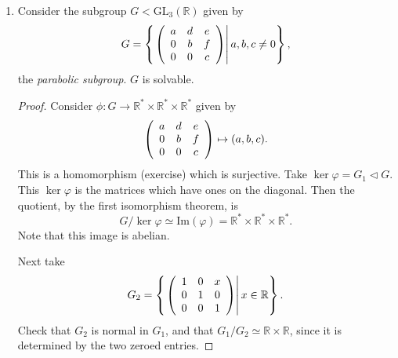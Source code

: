 \begin{xmpl}
\begin{enumerate}
  \item{Consider the subgroup $G < \mathrm{GL}_3(\mathbb{R})$ given by
      $$
      G = \left\{\left.
          \left(\begin{array}{c c c}
            a & d & e \\ 0 & b & f \\ 0 & 0 & c
          \end{array}\right)\right|a, b, c \neq 0\right\},
      $$
      the \emph{parabolic subgroup}. $G$ is solvable.

      \begin{proof}
        Consider $\phi : G
                     \to \mathbb{R}^* \times \mathbb{R}^* \times \mathbb{R}^*$
        given by
        $$
        \left(\begin{array}{c c c}
          a & d & e \\ 0 & b & f \\ 0 & 0 & c
        \end{array}\right) \mapsto (a,b,c).
        $$
        This is a homomorphism (exercise) which is
        surjective. Take $\ker \varphi = G_1 \triangleleft G$.
        This $\ker \varphi$ is the matrices which have ones on the
        diagonal. Then the quotient, by the first isomorphism theorem, is
        $$
        G / \ker \varphi
          \simeq \mathrm{Im}(\varphi)
          = \mathbb{R}^* \times \mathbb{R}^* \times \mathbb{R}^*.
        $$
        Note that this image is abelian.

        Next take
        $$
         G_2 =
          \left\{\left.
          \left(\begin{array}{c c c}
            1 & 0 & x \\ 0 & 1 & 0 \\ 0 & 0 & 1
          \end{array}\right)\right| x \in \mathbb{R}\right\}.
        $$
        Check that $G_2$ is normal in $G_1$, and that
        $G_1 / G_2 \simeq \mathbb{R} \times \mathbb{R}$, since it is
        determined by the two zeroed entries.


\end{proof}}
\end{enumerate}
\end{xmpl}
